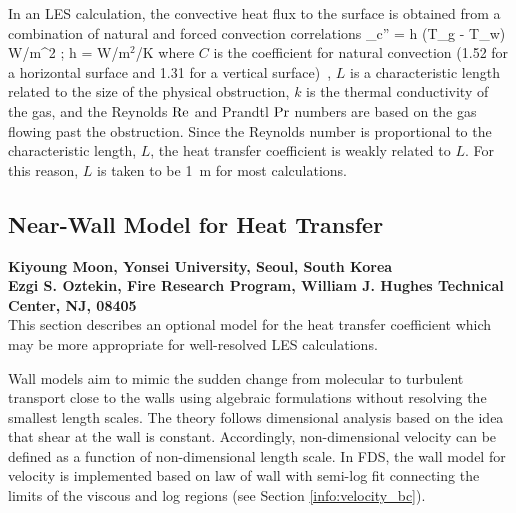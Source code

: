 In an LES calculation, the convective heat flux to the surface is
obtained from a combination of natural and forced
convection correlations
\be \dq_c'' = h (T_g - T_w)
    \quad \hbox{W/m}^2 \quad ; \quad h =
    \max \;   \quad
    \hbox{W/m$^2$/K} \ee
where $C$ is the coefficient for natural convection (1.52 for a horizontal surface
and 1.31 for a vertical surface)~\cite{Holman:1},
$L$ is a characteristic length related to the size of the physical
obstruction, $k$ is the thermal conductivity of the
gas, and the Reynolds $\hbox{Re}$ and Prandtl $\hbox{Pr}$ numbers are based on the
gas flowing
past the obstruction. Since the Reynolds number is proportional to the
characteristic length, $L$, the heat transfer coefficient is weakly
related to $L$. For this reason, $L$ is taken to be 1~m for most
calculations.


\subsection{Near-Wall Model for Heat Transfer}
\label{conflux_wall_model}

{\bf Kiyoung Moon, Yonsei University, Seoul, South Korea}\\
{\bf Ezgi S. Oztekin, Fire Research Program, William J. Hughes Technical Center, NJ, 08405}\\

This section describes an optional model for the heat transfer coefficient which may be more appropriate for well-resolved LES calculations.

Wall models aim to mimic the sudden change from molecular to turbulent transport close to the walls using algebraic formulations without resolving the smallest length scales. The theory follows dimensional analysis based on the idea that shear at the wall is constant. Accordingly, non-dimensional velocity can be defined as a function of non-dimensional length scale. In FDS, the wall model for velocity is implemented based on law of wall with semi-log fit connecting the limits of the viscous and log regions (see Section \ref{info:velocity_bc}).

